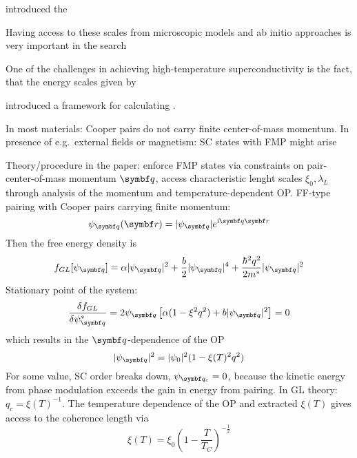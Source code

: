 \documentclass[../notes.tex]{subfiles}
\begin{document}
 introduced the 

Having access to these scales from microscopic models and ab initio approaches is very important in the search 

One of the challenges in achieving high-temperature superconductivity is the fact, that the energy scales given by 

\citeauthor{wittBypassingLatticeBCS2024} introduced a framework for calculating \cite{wittBypassingLatticeBCS2024}.


In most materials: Cooper pairs do not carry finite center-of-mass momentum.
In presence of e.g.\ external fields or magnetism: SC states with FMP might arise \cite{chenFiniteMomentumCooper2018, wanOrbitalFuldeFerrell2023, yuanSupercurrentDiodeEffect2022}

Theory/procedure in the paper: enforce FMP states via constraints on pair-center-of-mass momentum \(\vb{q}\), access characteristic lenght scales \(\xi_0, \lambda_L\) through analysis of the momentum and temperature-dependent OP\@.
FF-type pairing with Cooper pairs carrying finite momentum:
\begin{equation}
	\psi_{\vb{q}} (\vb{r}) = \vert \psi_{\vb{q}} \vert e^{\iu \vb{q} \vb{r}}
\end{equation}
Then the free energy density is
\begin{equation}
	f_{GL} [\psi_{\vb{q}}] = \alpha \vert \psi_{\vb{q}} \vert^2 + \frac{b}{2} \vert \psi_{\vb{q}} \vert^4 + \frac{\hbar^2 q^2}{2 m^*} \vert \psi_{\vb{q}} \vert^2
\end{equation}
Stationary point of the system:
\begin{equation}
	\fdv{f_{GL}}{\psi_{\vb{q}}^*} = 2 \psi_{\vb{q}} \left[\alpha (1 - \xi^2 q^2) + b \vert \psi_{\vb{q}} \vert^2\right] = 0
\end{equation}
which results in the \(\vb{q}\)-dependence of the OP
\begin{equation}
	\vert \psi_{\vb{q}} \vert^2 = \vert \psi_{0} \vert^2 (1 - \xi(T)^2 q^2)
\end{equation}
For some value, SC order breaks down, \(\psi_{\vb{q}_c} = 0\), because the kinetic energy from phase modulation exceeds the gain in energy from pairing.
In GL theory: \(q_c = \xi(T)^{-1}\).
The temperature dependence of the OP and extracted \(\xi(T)\) gives access to the coherence length via
\begin{equation}
	\xi(T) = \xi_0 (1 - \frac{T}{T_C})^{-\frac{1}{2}}
\end{equation}
\end{document}

